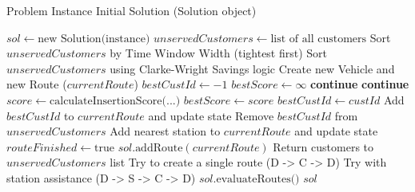\documentclass[a4paper,12pt]{article}
\begin{document}
\begin{algorithm}[H]
\caption{Initial Solution Generation}
\begin{algorithmic}[1]
\Require Problem Instance
\Ensure Initial Solution (Solution object)

\State $sol \gets \text{new Solution(instance)}$
\State $unservedCustomers \gets \text{list of all customers}$
\State
{}
    \State Sort $unservedCustomers$ by Time Window Width (tightest first)
\Else {}
    \State Sort $unservedCustomers$ using Clarke-Wright Savings logic
\EndIf
\State
{}
    \State Create new Vehicle and new Route ($currentRoute$)
        \State $bestCustId \gets -1$
        \State $bestScore \gets \infty$
            \State {}
             \textbf{continue} \EndIf
            \State {}
             \textbf{continue} \EndIf
            \State {}
            \State $score \gets \text{calculateInsertionScore(...)}$
                \State $bestScore \gets score$
                \State $bestCustId \gets custId$
            \EndIf
        \EndFor
            \State Add $bestCustId$ to $currentRoute$ and update state
            \State Remove $bestCustId$ from $unservedCustomers$
        \Else {}
                \State Add nearest station to $currentRoute$ and update state
            \Else
                \State $routeFinished \gets \text{true}$
            \EndIf
        \EndIf
    \EndWhile
        \State $sol.\text{addRoute}(currentRoute)$
    \Else {}
        \State Return customers to $unservedCustomers$ list
    \EndIf
\EndWhile
\State
{}
        \State Try to create a single route (D -> C -> D)
            \State Try with station assistance (D -> S -> C -> D)
        \EndIf
    \EndFor
\EndIf
\State
\State $sol.\text{evaluateRoutes()}$
\State \Return $sol$
\end{algorithmic}
\end{algorithm}
\end{document}
